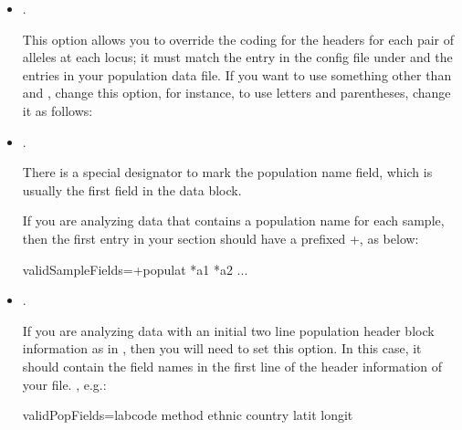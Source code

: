 \documentclass[letterpaper,10pt,english,openany,oneside]{sphinxmanual}
\begin{document}
\sphinxAtStartPar
\sphinxcode{\sphinxupquote{{[}ParseGenotypeFile{]}}} 
\begin{itemize}
\item {} 
\sphinxAtStartPar
{}.

\sphinxAtStartPar
This option allows you to override the coding for the headers for
each pair of alleles at each locus; it must match the entry in the
config file under  and the entries in your
population data file. If you want to use something other than 
and , change this option, for instance, to use letters and
parentheses, change it as follows: 
\sphinxstylestrong{{[}Default:}  \sphinxstylestrong{{]}}

\item {} 
\sphinxAtStartPar
{}.

\sphinxAtStartPar
There is a special designator to mark the population name field,
which is usually the first field in the data block. \sphinxstylestrong{{[}Default:}
\sphinxcode{\sphinxupquote{+}} \sphinxstylestrong{{]}}

\sphinxAtStartPar
If you are analyzing data that contains a population name for each
sample, then the first entry in your  section
should have a prefixed +, as below:

\begin{sphinxVerbatim}[commandchars=\\\{\}]
validSampleFields=+populat
 *a\PYGZus{}1
 *a\PYGZus{}2
 ...
\end{sphinxVerbatim}

\item {} 
\sphinxAtStartPar
{}.

\sphinxAtStartPar
If you are analyzing data with an initial two line population header
block information as in {\hyperref[\detokenize{docs/guide-chapter-usage:data-hla}]{}}, then you will
need to set this option. In this case, it should contain the field
names in the first line of the header information of your file.
, e.g.:

\begin{sphinxVerbatim}[commandchars=\\\{\}]
validPopFields=labcode
 method
 ethnic
 country
 latit
 longit
\end{sphinxVerbatim}

\end{itemize}
\end{document}
